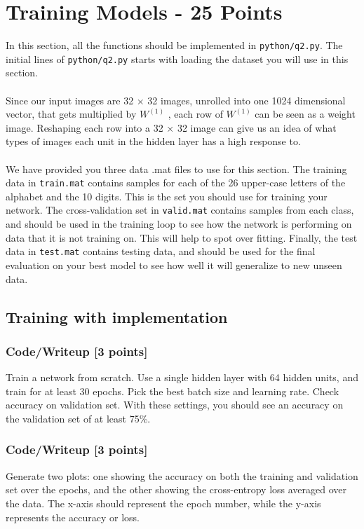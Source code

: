 \documentclass[a4 paper]{article}
\numberwithin{equation}{section}
\newcommand{\0}{\mathbf{0}}
\begin{document}
\newpage        
\section{Training Models - 25 Points}
    In this section, all the functions should be implemented in \texttt{python/q2.py}. The initial lines of \texttt{python/q2.py} starts with loading the dataset you will use in this section.\\
    \\
    Since our input images are 32 × 32 images, unrolled into one 1024 dimensional vector, that gets multiplied by $W^{(1)}$ , each row of $W^{(1)}$ can be seen as a weight image. Reshaping each row into a 32 × 32 image can give us an idea of what types of images each unit in the hidden layer has a high response to.\\
    \\
    We have provided you three data .mat files to use for this section. The training data in \texttt{train.mat} contains samples for each of the 26 upper-case letters of the alphabet and the 10 digits. This is the set you should use for training your network. The cross-validation set in \texttt{valid.mat} contains samples from each class, and should be used in the training loop to see how the network is performing on data that it is not training on. This will help to spot over fitting. Finally, the test data in \texttt{test.mat} contains testing data, and should be used for the final evaluation on your best model to see how well it will generalize to new unseen data.
    
    \subsection{Training with implementation}
        \subsubsection{Code/Writeup [3 points]}
        Train a network from scratch. Use a single hidden layer with 64 hidden units, and train for at least 30 epochs. Pick the best batch size and learning rate. Check accuracy on validation set. With these settings, you should see an accuracy on the validation set of at least 75\%.
        
        \subsubsection{Code/Writeup [3 points]}
        Generate two plots: one showing the accuracy on both the training and validation set over the epochs, and the other showing the cross-entropy loss averaged over the data. The x-axis should represent the epoch number, while the y-axis represents the accuracy or loss. 
        
\end{document}
